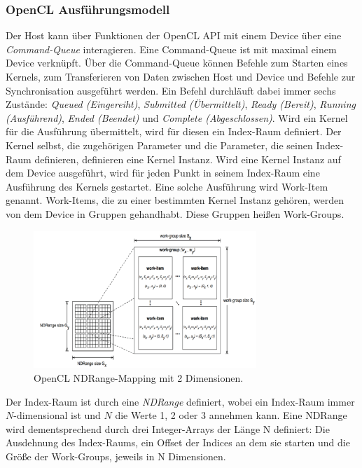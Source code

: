 \subsubsection*{OpenCL Ausführungsmodell}
Der Host kann über Funktionen der OpenCL API mit einem Device über eine \emph{Command-Queue} interagieren.
Eine Command-Queue ist mit maximal einem Device verknüpft.
Über die Command-Queue können Befehle zum Starten eines Kernels, zum Transferieren von Daten zwischen Host und Device und Befehle zur Synchronisation ausgeführt werden.
Ein Befehl durchläuft dabei immer sechs Zustände: \emph{Queued (Eingereiht)}, \emph{Submitted (Übermittelt)}, \emph{Ready (Bereit)}, \emph{Running (Ausführend)}, \emph{Ended (Beendet)} und \emph{Complete (Abgeschlossen)}.
Wird ein Kernel für die Ausführung übermittelt, wird für diesen ein Index-Raum definiert.
Der Kernel selbst, die zugehörigen Parameter und die Parameter, die seinen Index-Raum definieren, definieren eine Kernel Instanz.
Wird eine Kernel Instanz auf dem Device ausgeführt, wird für jeden Punkt in seinem Index-Raum eine Ausführung des Kernels gestartet.
Eine solche Ausführung wird Work-Item genannt.
Work-Items, die zu einer bestimmten Kernel Instanz gehören, werden von dem Device in Gruppen gehandhabt.
Diese Gruppen heißen Work-Groups.

\begin{figure}
	\centering
	\includegraphics[width=0.75\textwidth]{../../Grafiken/OpenCL-NDRange-Mapping.png}
	\caption{OpenCL NDRange-Mapping mit 2 Dimensionen. \cite{OCLSPC}}
	\label{fig::ga03}
\end{figure} 
Der Index-Raum ist durch eine \emph{NDRange} definiert, wobei ein Index-Raum immer $N$-dimensional ist und $N$ die Werte 1, 2 oder 3 annehmen kann.
Eine NDRange wird dementsprechend durch drei Integer-Arrays der Länge N definiert: Die Ausdehnung des Index-Raums, ein Offset der Indices an dem sie starten und die Größe der Work-Groups, jeweils in N Dimensionen.


